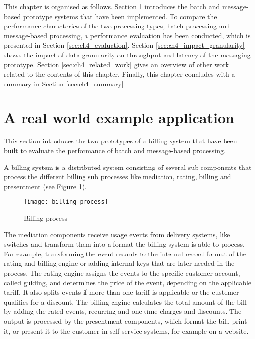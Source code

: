 This chapter is organised as follows. Section \ref{sec:ch4_prototype} introduces the batch and message-based prototype systems that have been implemented. To compare the performance characterics of the two processing types, batch processing and message-based processing, a performance evaluation has been conducted, which is presented in Section \ref{sec:ch4_evaluation}. Section \ref{sec:ch4_impact_granularity} shows the impact of data granularity on throughput and latency of the messaging prototype. Section \ref{sec:ch4_related_work} gives an overview of other work related to the contents of this chapter. Finally, this chapter concludes with a summary in Section \ref{sec:ch4_summary} 

\section{A real world example  application}\label{sec:ch4_prototype}
This section introduces the two prototypes of a billing system that have been built to evaluate the performance of batch and message-based processing.

A billing system is a distributed system consisting of several sub components that process the different billing sub processes like mediation, rating, billing and presentment (see Figure \ref{fig:ch4_billing_process}).

\begin{figure}[htbp]
	\centering
	\texttt{[image: billing\_process]}
	\caption{Billing process}
	\label{fig:ch4_billing_process}
\end{figure}

The mediation components receive usage events from delivery systems, like switches and transform them into a format the billing system is able to process. For example, transforming the event records to the internal record format of the rating and billing engine or adding internal keys that are later needed in the process. The rating engine assigns the events to the specific customer account, called guiding, and determines the price of the event, depending on the applicable tariff. It also splits events if more than one tariff is applicable or the customer qualifies for a discount. The billing engine calculates the total amount of the bill by adding the rated events, recurring and one-time charges and discounts. The output is processed by the presentment components, which format the bill, print it, or present it to the customer in self-service systems, for example on a website.

